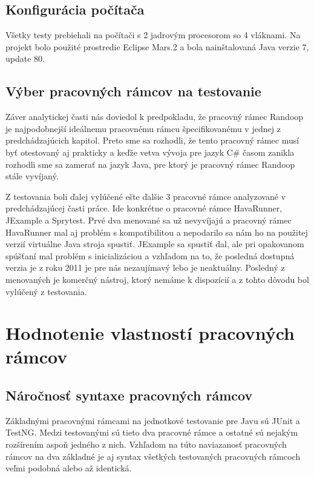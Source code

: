 \documentclass[11pt,twoside,slovak,a4paper]{article}
\begin{document}
	\subsection{Konfigurácia počítača}
	Všetky testy prebiehali na počítači s 2 jadrovým procesorom so 4 vláknami. Na projekt bolo použité prostredie Eclipse Mars.2 a bola nainštalovaná Java verzie 7, update 80.
	
	\subsection{Výber pracovných rámcov na testovanie}
	Záver analytickej časti nás doviedol k predpokladu, že pracovný rámec Randoop je najpodobnejší ideálnemu pracovnému rámcu špecifikovanému v jednej z predchádzajúcich kapitol. Preto sme sa rozhodli, že tento pracovný rámec musí byť otestovaný aj prakticky a keďže vetva vývoja pre jazyk C\# časom zanikla rozhodli sme sa zamerať na jazyk Java, pre ktorý je pracovný rámec Randoop stále vyvíjaný. 
	
	Z testovania boli ďalej vylúčené ešte ďalšie 3 pracovné rámce analyzované v predchádzajúcej časti práce. Ide konkrétne o pracovné rámce HavaRunner, JExample a Sprytest. Prvé dva menované sa už nevyvíjajú a pracovný rámec HavaRunner mal aj problém s kompatibilitou a nepodarilo sa nám ho na použitej verzií virtuálne Java stroja spustiť. JExample sa spustiť dal, ale pri opakovanom spúšťaní mal problém s inicializáciou a vzhľadom na to, že posledná dostupná verzia je z roku 2011 je pre nás nezaujímavý lebo je neaktuálny. Posledný z menovaných je komerčný nástroj, ktorý nemáme k dispozícií a z tohto dôvodu bol vylúčený z testovania.
	
	\newpage
	
	\section{Hodnotenie vlastností pracovných rámcov}
	
	\subsection{Náročnosť syntaxe pracovných rámcov}
	Základnými pracovnými rámcami na jednotkové testovanie pre Javu sú JUnit a TestNG. Medzi testovanými sú tieto dva pracovné rámce a ostatné sú nejakým rozšírením aspoň jedného z nich. Vzhľadom na túto naviazanosť pracovných rámcov na dva základné je aj syntax všetkých testovaných pracovných rámcoch veľmi podobná alebo až identická.
	
\end{document}

